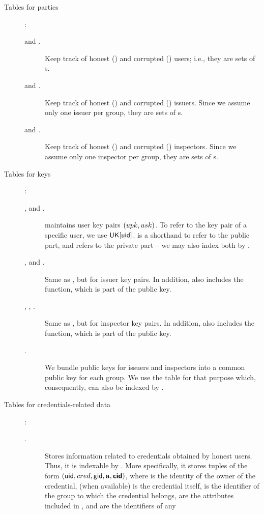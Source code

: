\begin{description}
\item[Tables for parties]:
  \begin{description}
  \item[\HU and \CU.] Keep track of honest (\HU) and corrupted (\CU) users;
    i.e., they are sets of {\uid}s.
  \item[\HI and \CI.] Keep track of honest (\HI) and corrupted (\CI) issuers.
    Since we assume only one issuer per group, they are sets of {\gid}s.
  \item[\HO and \CO.] Keep track of honest (\HO) and corrupted (\CO) inspectors.
    Since we assume only one inspector per group, they are sets of {\gid}s.
  \end{description}
\item[Tables for keys]:
  \begin{description}
  \item[\UK, \PUBUK and \PRVUK.] \UK maintains user key pairs $(upk,usk)$.
    To refer to the key pair of a specific user, we use $\mathsf{UK}[\mathsf{uid}]$. \PUBUK
    is a shorthand to refer to the public part, and \PRVUK refers to the
    private part -- we may also index both by \uid.
  \item[\IK, \PUBIK and \PRVIK.] Same as \UK, but for issuer key pairs. In
    addition, \IK also includes the \fissue function, which is part of the
    public key.
  \item[\OK, \PUBOK, \PRVOK.] Same as \UK, but for inspector key pairs. In
    addition, \OK also includes the \finsp function, which is part of the
    public key.
  \item[\GK.] We bundle public keys for issuers and inspectors into a common
    public key for each group. We use the table \GK for that purpose which,
    consequently, can also be indexed by \gid.
  \end{description}
\item[Tables for credentials-related data]:
  \begin{description}
  \item[\CRED.] Stores information related to credentials obtained by honest
    users. Thus, it is indexable by \cid. More specifically, it stores tuples of
    the form $(\mathsf{uid},cred,\mathsf{gid},\mathbf{a},\boldsymbol{\mathsf{cid}})$, where \uid is the identity of the
    owner of the credential, \cred (when available) is the credential itself,
    \gid is the identifier of the group to which the credential belongs, \attrs
    are the attributes included in \cred, and \scid are the identifiers of any

\end{description}
\end{description}
